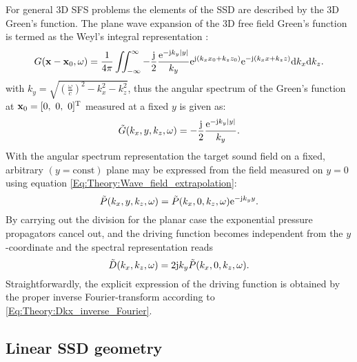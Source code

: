 \vspace{3mm}
For general 3D SFS problems the elements of the SSD are described by the 3D Green's function. The plane wave expansion of the 3D free field Green's function is termed as the Weyl's integral representation \cite{Williams1999, Lalor1969}:
\begin{equation}
G(\mathbf{x} - \mathbf{x}_0,\omega ) = \frac{1}{4\pi} \iint_{-\infty}^{\infty} -\frac{\mathrm{j}}{2}\frac{\mathrm{e}^{ -\mathrm{j} k_y  | y |  }}{ k_y }
\mathrm{e}^{\mathrm{j} (k_x x_0 + k_z z_0)} \mathrm{e}^{-\mathrm{j} (k_x x + k_z z)} \mathrm{d} k_x \mathrm{d} k_z.
\label{Eq:Theory:Weyls_integra}
\end{equation}
with $k_y = \sqrt{ \left( \frac{\omega}{c} \right )^2 - k_x^2 - k_z^2 }$, thus the angular spectrum of the Green's function at $\mathbf{x}_0 = [0,\ 0,\ 0]^{\mathrm{T}}$ measured at a fixed $y$ is given as:
\begin{equation}
\tilde{G}(k_x,y,k_z,\omega) =-\frac{\mathrm{j}}{2}\frac{\mathrm{e}^{ -\mathrm{j} k_y  | y |  }}{ k_y }.
\end{equation}
With the angular spectrum representation the target sound field on a fixed, arbitrary $(y=\mathrm{const})$ plane may be expressed from the field measured on $y=0$ using equation \eqref{Eq:Theory:Wave_field_extrapolation}:
\begin{equation}
\tilde{P}(k_x,y,k_z,\omega) = \tilde{P}(k_x,0,k_z,\omega) \mathrm{e}^{- \mathrm{j} k_y y}.
\label{Eq:Theory:Wave_field_extrapolation_2}
\end{equation}
By carrying out the division for the planar case the exponential pressure propagators cancel out, and the driving function becomes independent from the $y$-coordinate and the spectral representation reads
\begin{equation}
\tilde{D}(k_x,k_z,\omega) = 2\mathrm{j} k_y \tilde{P}(k_x,0,k_z,\omega).
\label{Eq:Theory:Planar_explicit_driv_fun}
\end{equation}
Straightforwardly, the explicit expression of the driving function is obtained by the proper inverse Fourier-transform according to \eqref{Eq:Theory:Dkx_inverse_Fourier}.

\subsection{Linear SSD geometry}

